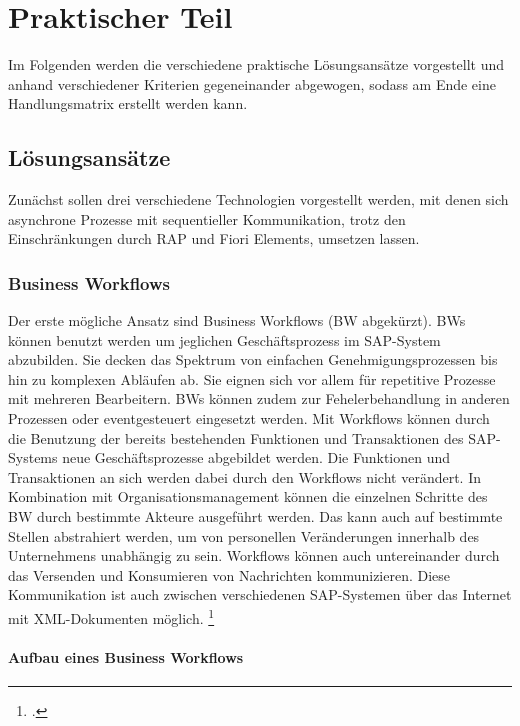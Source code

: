 \chapter{Praktischer Teil}

Im Folgenden werden die verschiedene praktische Lösungsansätze vorgestellt und anhand verschiedener Kriterien gegeneinander abgewogen, sodass am Ende eine Handlungsmatrix erstellt werden kann.

\section{Lösungsansätze}

Zunächst sollen drei verschiedene Technologien vorgestellt werden, mit denen sich asynchrone Prozesse mit sequentieller Kommunikation, trotz den Einschränkungen durch RAP und Fiori Elements, umsetzen lassen.

\subsection{Business Workflows}

Der erste mögliche Ansatz sind Business Workflows (BW abgekürzt). BWs können benutzt werden um jeglichen Geschäftsprozess im SAP-System abzubilden. Sie decken das Spektrum von einfachen Genehmigungsprozessen bis hin zu komplexen Abläufen ab. Sie eignen sich vor allem für repetitive Prozesse mit mehreren Bearbeitern. BWs können zudem zur Fehelerbehandlung in anderen Prozessen oder eventgesteuert eingesetzt werden. Mit Workflows können durch die Benutzung der bereits bestehenden Funktionen und Transaktionen des SAP-Systems neue Geschäftsprozesse abgebildet werden. Die Funktionen und Transaktionen an sich werden dabei durch den Workflows nicht verändert. In Kombination mit Organisationsmanagement können die einzelnen Schritte des BW durch bestimmte Akteure ausgeführt werden. Das kann auch auf bestimmte Stellen abstrahiert werden, um von personellen Veränderungen innerhalb des Unternehmens unabhängig zu sein. Workflows können auch untereinander durch das Versenden und Konsumieren von Nachrichten kommunizieren. Diese Kommunikation ist auch zwischen verschiedenen SAP-Systemen über das Internet mit XML-Dokumenten möglich. \footcite[Vgl.][]{sap_business-workflows_2022-1}

\subsubsection{Aufbau eines Business Workflows}

